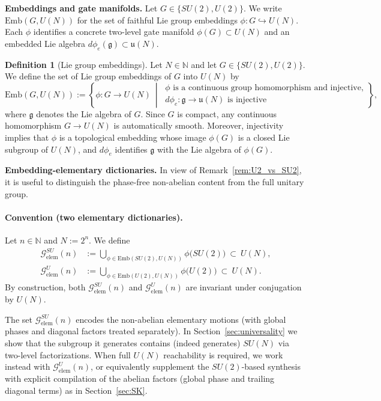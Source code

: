 \documentclass{article}%
\theoremstyle{definition}
\newtheorem{definition}[theorem]{Definition}
\numberwithin{equation}{section}
\newcommand{\Emb}{\mathrm{Emb}}
\begin{document}
\medskip
\noindent\textbf{Embeddings and gate manifolds.}
Let $G\in\{SU(2),U(2)\}$. We write $\Emb(G,U(N))$ for the set of faithful Lie group embeddings
$\phi:G\hookrightarrow U(N)$. Each $\phi$ identifies a concrete two-level gate manifold
$\phi(G)\subset U(N)$ and an embedded Lie algebra $d\phi_e(\mathfrak g)\subset\mathfrak u(N)$.

\begin{definition}[Lie group embeddings]\label{def:embedding}
Let $N\in\mathbb{N}$ and let $G\in\{SU(2),U(2)\}$.
We define the set of Lie group embeddings of $G$ into $U(N)$ by
\[
\Emb(G,U(N))
:=
\left\{\phi:G\to U(N)\ \middle|\
\begin{array}{l}
\phi \text{ is a continuous group homomorphism and injective,}\\[2pt]
d\phi_e:\mathfrak g\to\mathfrak{u}(N)\text{ is injective}
\end{array}
\right\},
\]
where $\mathfrak g$ denotes the Lie algebra of $G$.
Since $G$ is compact, any continuous homomorphism $G\to U(N)$ is automatically smooth. Moreover,
injectivity implies that $\phi$ is a topological embedding whose image $\phi(G)$ is a closed Lie
subgroup of $U(N)$, and $d\phi_e$ identifies $\mathfrak g$ with the Lie algebra of $\phi(G)$.
\end{definition}

\medskip
\noindent\textbf{Embedding-elementary dictionaries.}
In view of Remark~\ref{rem:U2_vs_SU2}, it is useful to distinguish the phase-free non-abelian content
from the full unitary group.

\paragraph{Convention (two elementary dictionaries).}
Let $n\in\mathbb{N}$ and $N:=2^n$. We define
\begin{align}
\label{eq:Gelem_def_SU}
\mathcal{G}^{SU}_{\mathrm{elem}}(n)
&:=\bigcup_{\phi\in \Emb(SU(2),U(N))}\phi\big(SU(2)\big)\ \subset\ U(N),
\\
\label{eq:Gelem_def_U}
\mathcal{G}^{U}_{\mathrm{elem}}(n)
&:=\bigcup_{\phi\in \Emb(U(2),U(N))}\phi\big(U(2)\big)\ \subset\ U(N).
\end{align}
By construction, both $\mathcal{G}^{SU}_{\mathrm{elem}}(n)$ and $\mathcal{G}^{U}_{\mathrm{elem}}(n)$
are invariant under conjugation by $U(N)$.

The set $\mathcal{G}^{SU}_{\mathrm{elem}}(n)$ encodes the non-abelian elementary motions (with global
phases and diagonal factors treated separately). In Section~\ref{sec:universality} we show that the
subgroup it generates contains (indeed generates) $SU(N)$ via two-level factorizations. When full
$U(N)$ reachability is required, we work instead with $\mathcal{G}^{U}_{\mathrm{elem}}(n)$, or
equivalently supplement the $SU(2)$-based synthesis with explicit compilation of the abelian factors
(global phase and trailing diagonal terms) as in Section~\ref{sec:SK}.
\end{document}
